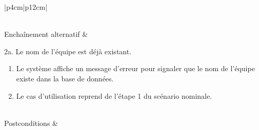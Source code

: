 \begin{longtable}{|p{4cm}|p{12cm}|}
\begin{minipage}[t]{\linewidth}
                \end{minipage}
                 \\
                \hline
                Enchaînement alternatif &  
                \begin{minipage}[t]{\linewidth}
                    2a. Le nom de l'équipe est déjà existant.
                    \begin{enumerate}[nosep,after=\strut]
                          \item Le système affiche un message d'erreur pour signaler que le nom de l'équipe existe dans la base de données.
                          \item Le cas d’utilisation reprend de l’étape 1 du scénario nominale.
                    \end{enumerate}
                \end{minipage}
                \\
                
                \hline
                Postconditions &   \\
                \hline
                \caption{Description du cas d'utilisation « Ajouter équipe »}\\
        \end{longtable}        
        
